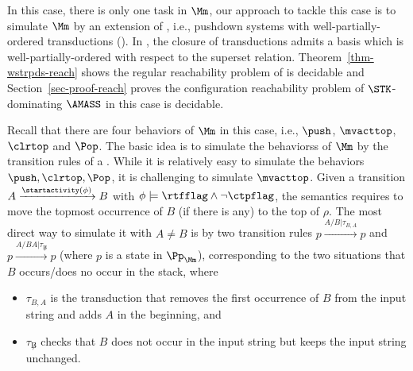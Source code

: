 
In this case, there is only one task in $\Mm$, our approach to tackle this case is to simulate $\Mm$ by an extension of {\TrPDS}, i.e., pushdown systems with well-partially-ordered transductions ({\WOTrPDS}). In {\WOTrPDS}, the closure of transductions admits a basis which is well-partially-ordered with respect to the superset relation.
Theorem~\ref{thm-wstrpds-reach} shows the regular reachability problem of {\WOTrPDS} is decidable and Section~\ref{sec-proof-reach} proves the configuration reachability problem of $\STK$-dominating $\AMASS$ in this case is decidable.

Recall that there are four behaviors of $\Mm$ in this case, i.e., $\push$, $\mvacttop$, $\clrtop$ and $\Pop$.
The basic idea is to simulate the behaviorss of $\Mm$ by the transition rules of a {\TrPDS}. While it is relatively easy to simulate the behaviors $\push, \clrtop, \Pop$, %
it is challenging to simulate $\mvacttop$. Given a transition $A\xrightarrow{\startactivity(\phi)}B$ with $\phi\models\rtfflag\wedge\neg\ctpflag$, the semantics requires to move the topmost occurrence of $B$ (if there is any) to the top of $\rho$. The most direct way to simulate it with $A \neq B$ is by two transition rules $p \xrightarrow{A / B | \tau_{B, A}} p$ and  $p \xrightarrow{A / BA | \tau_{\not B}} p$
(where $p$ is a state in $\Pp_\Mm$), corresponding to the two situations that $B$ occurs/does no occur in the stack, where 
\begin{itemize}
\item $\tau_{B, A}$ is the transduction that removes the first occurrence of $B$ from the input string and adds $A$ in the beginning, and
%
\item $\tau_{\not B}$ checks that $B$ does not occur in the input string but keeps the input string unchanged. 
\end{itemize}

